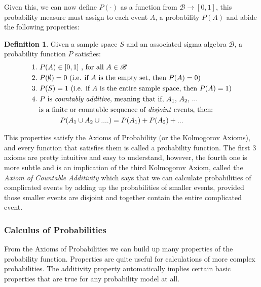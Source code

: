 \documentclass[
  oneside,
  11pt, a4paper,
  footinclude=true,
  headinclude=true,
  cleardoublepage=empty
]{scrbook}
\theoremstyle{definition}
\newtheorem{definition}{Definition}[section]
\theoremstyle{definition}
\begin{document}
                Given this, we can now define $P(\cdot)$ as a function from $\mathscr{B} \rightarrow [0,1]$, this probability measure must assign to each event $A$, a probability $P(A)$ and abide the following properties:
                
                \begin{definition}{Given a sample space $S$ and an associated sigma algebra $\mathscr{B}$, a probability function $P$ satisfies:}
                \begin{align*}
                & 1.\ P(A) \in [0, 1]\ \text{, for all}\ A \in \mathscr{B} \\
                & 2.\ P(\emptyset) = 0\ \text{(i.e. if $A$ is the empty set, then $P(A) = 0$)} \\
                & 3.\ P(S) = 1\ \text{(i.e. if $A$ is the entire sample space, then $P(A) = 1$)} \\
                & 4.\ \text{$P$ is \emph{countably additive}, meaning that if, $A_1$, $A_2$, ...} \\ 
                & \quad \text{is a finite or countable sequence of \emph{disjoint} events, then:}\\
                & \qquad\qquad P(A_1 \cup A_2 \cup ....) = P(A_1) + P(A_2) + \text{...} 
                \end{align*}{}
                \end{definition}{}
                
                This properties satisfy the Axioms of Probability (or the Kolmogorov Axioms), and every function that satisfies them is called a probability function. The first 3 axioms are pretty intuitive and easy to understand, however, the fourth one is more subtle and is an implication of the third Kolmogorov Axiom, called the \emph{Axiom of Countable Additivity} which says that we can calculate probabilities of complicated events by adding up the probabilities of smaller events, provided those smaller events are disjoint and together contain the entire complicated event.
        
        \subsubsection{Calculus of Probabilities}
            
            From the Axioms of Probabilities we can build up many properties of the probability function. Properties are quite useful for calculations of more complex probabilities. The additivity property automatically implies certain basic properties that are true for any probability model at all.
            
\end{document}
